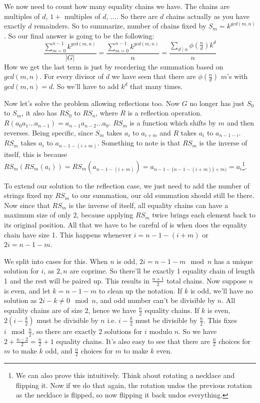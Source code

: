\documentclass[a4paper,10pt]{article}
\theoremstyle{definition} %
\begin{document}
    We now need to count how many equality chains we have. The chains are multiples of $d$, $1+$ multiples of $d$, $\dots$. So there are $d$ chains actually as you have exactly $d$ remainders. So to summarize, number of chains
    fixed by $S_m = k^{gcd(m,n)}$. So our final answer is going to be the following:
    \[ \frac{\sum_{m=0}^{n-1} k^{gcd(m,n)}}{|G|} = \frac{\sum_{m=0}^{n-1} k^{gcd(m,n)}}{n} = \frac{\sum_{d \mid n} \phi(\frac{n}{d})k^d}{n} \]
    How we get the last term is just by reordering the summation based on $gcd(m,n)$. For every divisor of $d$ we have seen that there are $\phi(\frac{n}{d})$
    $m$'s with $gcd(m,n) = d$. So we'll have to add $k^d$ that many times.

    Now let's solve the problem allowing reflections too. Now $G$ no longer has just $S_0$ to $S_m$, it also has $RS_0$ to $RS_n$, where $R$ is a reflection 
    operation. $R(a_0a_1 \dots a_{n-1}) = a_{n-1} a_{n-2} \dots a_0$. $RS_m$ is a function which shifts by $m$ and then reverses. Being specific, since $S_m$ 
    takes $a_i$ to $a_{i+m}$ and $R$ takes $a_i$ to $a_{n-1-i}$. $RS_m$ takes $a_i$ to $a_{n-1-(i+m)}$. Something to note is that $RS_m$ is the inverse of itself,
    this is because $RS_m(RS_m(a_i)) = RS_m(a_{n-1-(i+m)}) = a_{n-1-\{n-1-(i+m)\}+m)} = a_i$\footnote{We can also prove this intuitively. Think about rotating a necklace
    and flipping it. Now if we do that again, the rotation undos the previous rotation as the necklace is flipped, so now flipping it back undos everything.}.

    To extend our solution to the reflection case, we just need to add the number of strings fixed my $RS_m$ to our summation, our old summation should still be there.
    Now since that $RS_m$ is the inverse of itself, all equality chains can have a maximum size of only 2, because applying $RS_m$ twice brings each element back to its 
    original position. All that we have to be careful of is when does the equality chain have size 1. This happens whenever $i = n-1-(i+m)$ or $2i = n-1-m$.

    We split into cases for this. When $n$ is odd, $2i = n-1-m \mod n$ has a unique solution for $i$, as $2, n$ are coprime. So there'll be exactly 1 equality chain of length
    1 and the rest will be paired up. This results in $\frac{n+1}{2}$ total chains. Now suppose $n$ is even, and let $k = n-1-m$ to clean up the notation. If $k$ is odd, we'll 
    have no solution as $2i - k \neq 0 \mod n$, and odd number can't be divisible by $n$. All equality chains are of size 2, hence we have $\frac{n}{2}$ equality chains.
    If $k$ is even, $2(i - \frac{k}{2})$ must be divisible by $n$ i.e. $i - \frac{k}{2}$ must be divisible by $\frac{n}{2}$. This fixes $i \mod \frac{n}{2}$, so there are exactly
    2 solutions for $i$ modulo $n$. So we have $2 + \frac{n-2}{2} =  \frac{n}{2} + 1$ equality chains. It's also easy to see that there are $\frac{n}{2}$ choices for $m$ to make 
    $k$ odd, and $\frac{n}{2}$ choices for $m$ to make $k$ even.
\end{document}
